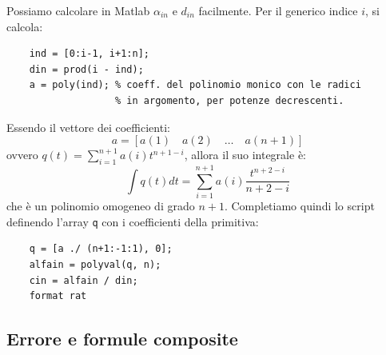 Possiamo calcolare in Matlab $\alpha_{in}$ e $d_{in}$ facilmente. Per il generico indice $i$, si calcola:
\begin{verbatim}
    ind = [0:i-1, i+1:n];
    din = prod(i - ind);
    a = poly(ind); % coeff. del polinomio monico con le radici
                   % in argomento, per potenze decrescenti.
    \end{verbatim}
    
    Essendo il vettore dei coefficienti:
    \begin{equation*}
    a = [a(1) \quad a(2) \quad \dots \quad a(n+1)]
    \end{equation*}
    ovvero $q(t) = \sum_{i=1}^{n+1} a(i) t^{n+1-i}$, allora il suo integrale è:
    \begin{equation*}
    \int q(t) dt = \sum_{i=1}^{n+1} a(i) \frac{t^{n+2-i}}{n+2-i}
    \end{equation*}
    che è un polinomio omogeneo di grado $n+1$. Completiamo quindi lo script definendo l'array \texttt{q} con i coefficienti della primitiva:
    \begin{verbatim}
    q = [a ./ (n+1:-1:1), 0];
    alfain = polyval(q, n);
    cin = alfain / din;
    format rat
    \end{verbatim}

\vspace{0.6cm}
\subsection{Errore e formule composite}

